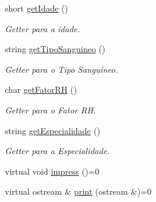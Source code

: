 \begin{DoxyCompactItemize}
short \hyperlink{classFuncionario_ac8b1947b4cb1c1216291c4750670fba2}{get\+Idade} ()
\begin{DoxyCompactList}\small\item\em Getter para a idade. \end{DoxyCompactList}\item 
string \hyperlink{classFuncionario_aedc6d72aaa308192628b749db2fad037}{get\+Tipo\+Sanguineo} ()
\begin{DoxyCompactList}\small\item\em Getter para o Tipo Sanguíneo. \end{DoxyCompactList}\item 
char \hyperlink{classFuncionario_a094e2183a16b6a6acbf1dac8ecc5a52a}{get\+Fator\+RH} ()
\begin{DoxyCompactList}\small\item\em Getter para o Fator RH. \end{DoxyCompactList}\item 
string \hyperlink{classFuncionario_a1a814a8a11d9750dbfedcf8cdf87fd45}{get\+Especialidade} ()
\begin{DoxyCompactList}\small\item\em Getter para a Especialidade. \end{DoxyCompactList}\item 
virtual void \hyperlink{classFuncionario_aeaa43599aa64998372ad7044315ed4f7}{impress} ()=0
\item 
virtual ostream \& \hyperlink{classFuncionario_a06bb354ea21c7059a9740a6402f26b5c}{print} (ostream \&)=0
\end{DoxyCompactItemize}
